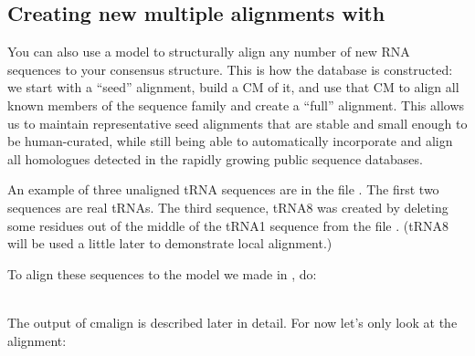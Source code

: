 \subsection{Creating new multiple alignments with }

You can also use a model to structurally align any number of new RNA
sequences to your consensus structure. This is how the 
database is constructed: we start with a ``seed'' alignment, build a CM
of it, and use that CM to align all known members of the sequence
family and create a ``full'' alignment. This allows us to maintain
representative seed alignments that are stable and small enough to be
human-curated, while still being able to automatically incorporate and
align all homologues detected in the rapidly growing public sequence
databases.

An example of three unaligned tRNA sequences are in the file
. The first two sequences are real tRNAs. The third
sequence, tRNA8 was created by deleting some residues out of the middle
of the tRNA1 sequence from the file . (tRNA8 will be used a little later to
demonstrate local alignment.)

To align these sequences to the model we made in , do:

\\

The output of cmalign is described later in detail. For now let's only
look at the alignment:

